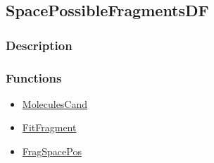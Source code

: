 \subsection{SpacePossibleFragmentsDF}\label{SpacePossibleFragmentsDF}
\subsubsection{Description}


\subsubsection{Functions}
\begin{itemize}
\item \hyperref[MoleculesCand]{MoleculesCand}
\item \hyperref[FitFragment]{FitFragment}
\item \hyperref[FragSpacePos]{FragSpacePos}
\end{itemize}

